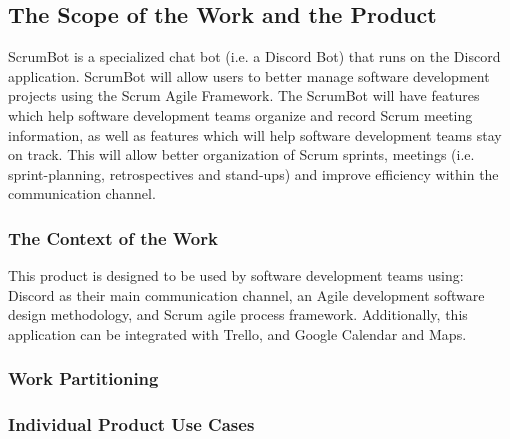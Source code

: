 \documentclass[12pt, titlepage]{article}
\begin{document}
\subsection{The Scope of the Work and the Product}
ScrumBot is a specialized chat bot (i.e. a Discord Bot) that runs on the Discord application. ScrumBot will allow users to better manage software development projects using the Scrum Agile Framework. The ScrumBot will have features which help software development teams organize and record Scrum meeting information, as well as features which will help software development teams stay on track. This will allow better organization of Scrum sprints, meetings  (i.e. sprint-planning, retrospectives  and  stand-ups) and  improve  efficiency  within  the communication channel.

\subsubsection{The Context of the Work}
This product is designed to be used by software development teams using: Discord as their main communication channel, an Agile development software design methodology, and Scrum agile process framework. Additionally, this application can be integrated with Trello, and Google Calendar and Maps.

\subsubsection{Work Partitioning}

\subsubsection{Individual Product Use Cases}
\end{document}
